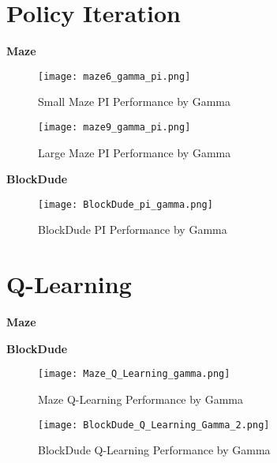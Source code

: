 \documentclass{article}
\begin{document}

\section{Policy Iteration} \label{PI}

\textbf{Maze}

\begin{figure}
    \centering
    \begin{minipage}{0.5\textwidth}
        \centering
        \texttt{[image: maze6\_gamma\_pi.png]}
        \caption{Small Maze PI Performance by Gamma}
        \label{fig:small-maze-pi}
    \end{minipage}\hfill
    \begin{minipage}{0.5\textwidth}
        \centering
        \texttt{[image: maze9\_gamma\_pi.png]}
        \caption{Large Maze PI Performance by Gamma}
        \label{fig:large-maze-pi}
    \end{minipage}
\end{figure}

\textbf{BlockDude}

\begin{figure}
    \centering
    \label{fig:DT-ccp}
    \texttt{[image: BlockDude\_pi\_gamma.png]}
    \caption{BlockDude PI Performance by Gamma}
\end{figure}


\section{Q-Learning} \label{QL}

\textbf{Maze}

\textbf{BlockDude}

\begin{figure}
    \centering
    \begin{minipage}{0.5\textwidth}
        \centering
        \texttt{[image: Maze\_Q\_Learning\_gamma.png]}
        \caption{Maze Q-Learning Performance by Gamma}
        \label{fig:small-maze-pi}
    \end{minipage}\hfill
    \begin{minipage}{0.5\textwidth}
        \centering
        \texttt{[image: BlockDude\_Q\_Learning\_Gamma\_2.png]}
        \caption{BlockDude Q-Learning Performance by Gamma}
        \label{fig:large-maze-pi}
    \end{minipage}
\end{figure}
\end{document}

